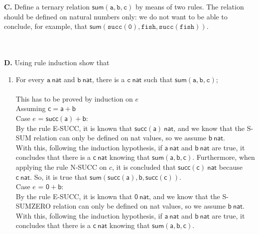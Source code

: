\documentclass[a4paper]{article}
\begin{document}
\textbf{C.} Define a ternary relation
$\mathsf{sum}(\mathtt a, \mathtt b, \mathtt c)$ by means of two rules. The
relation should be defined on natural numbers only: we do not want to be able to
conclude, for example, that  $\mathsf{sum}(\mathtt{succ(0)}, \mathtt{fish},
\mathtt{succ(fish)})$.
\\\\
\textbf{D.} Using rule induction show that
\begin{enumerate}
\item For every $\mathtt a~\mathsf{nat}$ and
  $\mathtt b~\mathsf{nat}$, there is a $\mathtt c~\mathsf{nat}$ such that
  $\mathsf{sum}(\mathtt a, \mathtt b, \mathtt c)$;\\\\
  This has to be proved by induction on $e$\\
  Assuming $\mathsf {c = a + b}$\\
  
  Case $e$ = $\mathsf {succ(a) + b}$:\\
  By the rule E-SUCC, it is known that $\mathsf {succ(a)}~\mathsf{nat}$, and we know that the S-SUM relation can only be defined on nat values, so we assume $\mathsf {b}~\mathsf{nat}$.\\
  With this, following the induction hypothesis, if $\mathsf {a}~\mathsf{nat}$ and $\mathsf {b}~\mathsf{nat}$ are true, it concludes that there is a $\mathsf {c}~\mathsf{nat}$ knowing that $\mathsf {sum(a, b, c)}$. Furthermore, when applying the rule N-SUCC on $c$, it is concluded that $\mathsf {succ(c)}~\mathsf{nat}$ because $\mathsf {c}~\mathsf{nat}$. So, it is true that $\mathsf {sum(succ(a), b, succ(c))}$.\\
  
  Case $e$ = $\mathsf {0 + b}$:\\
  By the rule E-SUCC, it is known that $\mathsf 0~\mathsf{nat}$, and we know that the S-SUMZERO relation can only be defined on nat values, so we assume $\mathsf {b}~\mathsf{nat}$.\\
  With this, following the induction hypothesis, if $\mathsf {a}~\mathsf{nat}$ and $\mathsf {b}~\mathsf{nat}$ are true, it concludes that there is a $\mathsf {c}~\mathsf{nat}$ knowing that $\mathsf {sum(a, b, c)}$.
  

\end{enumerate}
\end{document}
